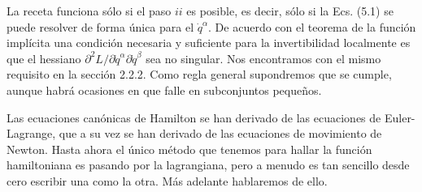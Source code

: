 La receta funciona sólo si el paso $i i$ es posible, es decir, sólo si la Ecs. (5.1) se puede resolver de forma única para el $\dot{q}^{\alpha}$. De acuerdo con el teorema de la función implícita una condición necesaria y suficiente para la invertibilidad localmente es que el hessiano $\partial^{2} L / \partial \dot{q}^{\alpha} \partial \dot{q}^{\beta}$ sea no singular. Nos encontramos con el mismo requisito en la sección 2.2.2. Como regla general supondremos que se cumple, aunque habrá ocasiones en que falle en subconjuntos pequeños.

Las ecuaciones canónicas de Hamilton se han derivado de las ecuaciones de Euler-Lagrange, que a su vez se han derivado de las ecuaciones de movimiento de Newton. Hasta ahora el único método que tenemos para hallar la función hamiltoniana es pasando por la lagrangiana, pero a menudo es tan sencillo desde cero escribir una como la otra. Más adelante hablaremos de ello.



